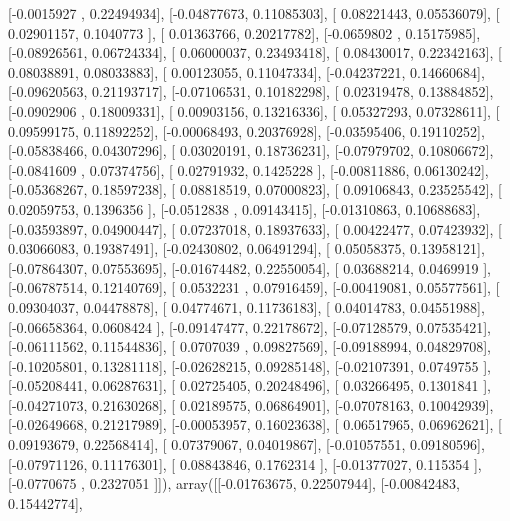 \documentclass{article}
\begin{document}
       [-0.0015927 ,  0.22494934],
       [-0.04877673,  0.11085303],
       [ 0.08221443,  0.05536079],
       [ 0.02901157,  0.1040773 ],
       [ 0.01363766,  0.20217782],
       [-0.0659802 ,  0.15175985],
       [-0.08926561,  0.06724334],
       [ 0.06000037,  0.23493418],
       [ 0.08430017,  0.22342163],
       [ 0.08038891,  0.08033883],
       [ 0.00123055,  0.11047334],
       [-0.04237221,  0.14660684],
       [-0.09620563,  0.21193717],
       [-0.07106531,  0.10182298],
       [ 0.02319478,  0.13884852],
       [-0.0902906 ,  0.18009331],
       [ 0.00903156,  0.13216336],
       [ 0.05327293,  0.07328611],
       [ 0.09599175,  0.11892252],
       [-0.00068493,  0.20376928],
       [-0.03595406,  0.19110252],
       [-0.05838466,  0.04307296],
       [ 0.03020191,  0.18736231],
       [-0.07979702,  0.10806672],
       [-0.0841609 ,  0.07374756],
       [ 0.02791932,  0.1425228 ],
       [-0.00811886,  0.06130242],
       [-0.05368267,  0.18597238],
       [ 0.08818519,  0.07000823],
       [ 0.09106843,  0.23525542],
       [ 0.02059753,  0.1396356 ],
       [-0.0512838 ,  0.09143415],
       [-0.01310863,  0.10688683],
       [-0.03593897,  0.04900447],
       [ 0.07237018,  0.18937633],
       [ 0.00422477,  0.07423932],
       [ 0.03066083,  0.19387491],
       [-0.02430802,  0.06491294],
       [ 0.05058375,  0.13958121],
       [-0.07864307,  0.07553695],
       [-0.01674482,  0.22550054],
       [ 0.03688214,  0.0469919 ],
       [-0.06787514,  0.12140769],
       [ 0.0532231 ,  0.07916459],
       [-0.00419081,  0.05577561],
       [ 0.09304037,  0.04478878],
       [ 0.04774671,  0.11736183],
       [ 0.04014783,  0.04551988],
       [-0.06658364,  0.0608424 ],
       [-0.09147477,  0.22178672],
       [-0.07128579,  0.07535421],
       [-0.06111562,  0.11544836],
       [ 0.0707039 ,  0.09827569],
       [-0.09188994,  0.04829708],
       [-0.10205801,  0.13281118],
       [-0.02628215,  0.09285148],
       [-0.02107391,  0.0749755 ],
       [-0.05208441,  0.06287631],
       [ 0.02725405,  0.20248496],
       [ 0.03266495,  0.1301841 ],
       [-0.04271073,  0.21630268],
       [ 0.02189575,  0.06864901],
       [-0.07078163,  0.10042939],
       [-0.02649668,  0.21217989],
       [-0.00053957,  0.16023638],
       [ 0.06517965,  0.06962621],
       [ 0.09193679,  0.22568414],
       [ 0.07379067,  0.04019867],
       [-0.01057551,  0.09180596],
       [-0.07971126,  0.11176301],
       [ 0.08843846,  0.1762314 ],
       [-0.01377027,  0.115354  ],
       [-0.0770675 ,  0.2327051 ]]), array([[-0.01763675,  0.22507944],
       [-0.00842483,  0.15442774],
\end{document}
